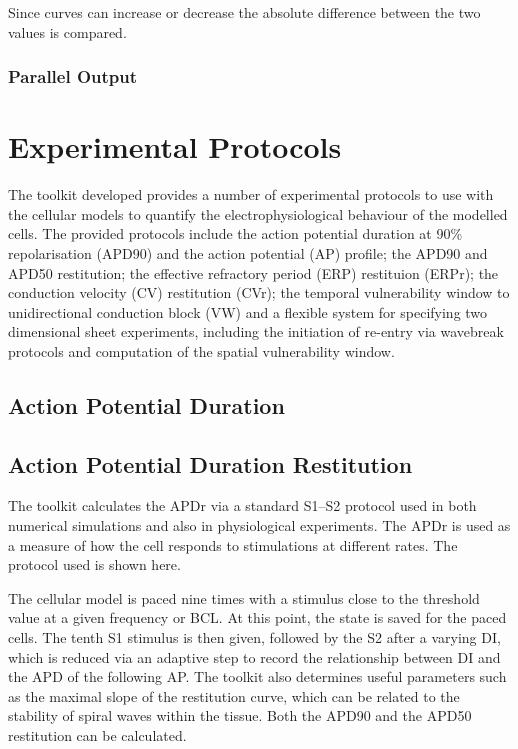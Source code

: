 Since curves can increase or decrease the absolute difference between the two
values is compared.

\subsubsection{Parallel Output}


\section{Experimental Protocols}

The toolkit developed provides a number of experimental protocols to use with
the cellular models to quantify the electrophysiological behaviour of the
modelled cells.  The provided protocols include the action potential duration at
90\% repolarisation (APD90) and the action potential (AP) profile; the
APD90 and APD50 restitution; the effective refractory period (ERP) restituion
(ERPr); the conduction velocity (CV) restitution (CVr); the temporal
vulnerability window to unidirectional conduction block (VW) and a flexible
system for specifying two dimensional sheet experiments, including the
initiation of re-entry via wavebreak protocols and computation of the spatial
vulnerability window.

\subsection{Action Potential Duration}

\subsection{Action Potential Duration Restitution}

The toolkit calculates the APDr via a standard S1--S2 protocol used in both
numerical simulations and also in physiological experiments.  The APDr is used
as a measure of how the cell responds to stimulations at different rates.  The
protocol used is shown here.


The cellular model is paced nine times with a stimulus close to the threshold
value at a given frequency or BCL.  At this point, the state is saved for the
paced cells.  The tenth S1 stimulus is then given, followed by the S2 after a
varying DI, which is reduced via an adaptive step to record the relationship
between DI and the APD of the following AP.  The toolkit also determines useful
parameters such as the maximal slope of the restitution curve, which can be
related to the stability of spiral waves within the tissue.  Both the APD90 and
the APD50 restitution can be calculated.

